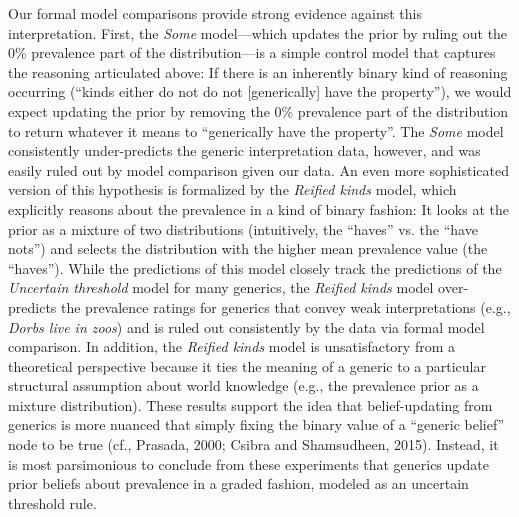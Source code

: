 \documentclass[floatsintext,doc]{apa6}
\begin{document}
Our formal model comparisons provide strong evidence against this interpretation.
First, the \emph{Some} model---which updates the prior by ruling out the 0\% prevalence part of the distribution---is a simple control model that captures the reasoning articulated above: If there is an inherently binary kind of reasoning occurring (``kinds either do not do not [generically] have the property''), we would expect updating the prior by removing the 0\% prevalence part of the distribution to return whatever it means to ``generically have the property''. 
The \emph{Some} model consistently under-predicts the generic interpretation data, however, and was easily ruled out by model comparison given our data.
An even more sophisticated version of this hypothesis is formalized by the \emph{Reified kinds} model, which explicitly reasons about the prevalence in a kind of binary fashion: It looks at the prior as a mixture of two distributions (intuitively, the ``haves'' vs. the ``have nots'') and selects the distribution with the higher mean prevalence value (the ``haves'').
While the predictions of this model closely track the predictions of the \emph{Uncertain threshold} model for many generics, the \emph{Reified kinds} model over-predicts the prevalence ratings for generics that convey weak interpretations (e.g., \emph{Dorbs live in zoos}) and is ruled out consistently by the data via formal model comparison. 
In addition, the \emph{Reified kinds} model is unsatisfactory from a theoretical perspective because it ties the meaning of a generic to a particular structural assumption about world knowledge (e.g., the prevalence prior as a mixture distribution). 
These results support the idea that belief-updating from generics is more nuanced that simply fixing the binary value of a ``generic belief'' node to be true (cf., Prasada, 2000; Csibra and Shamsudheen, 2015).
Instead, it is most parsimonious to conclude from these experiments that generics update prior beliefs about prevalence in a graded fashion, modeled as an uncertain threshold rule.
%
%
\end{document}
